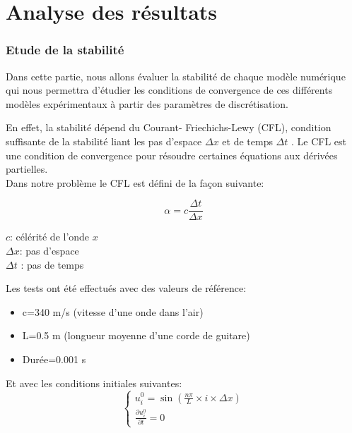\part{Analyse des résultats}


\section{Etude de la stabilité}

Dans cette partie, nous allons évaluer la stabilité de chaque modèle numérique qui nous permettra d'étudier les conditions de convergence de ces différents modèles expérimentaux à partir des paramètres de discrétisation.


En effet, la stabilité dépend du Courant- Friechichs-Lewy (CFL), condition suffisante de la stabilité liant les pas d'espace $\Delta x $ et de temps $\Delta t$ . Le CFL est une condition de convergence pour résoudre certaines équations aux dérivées partielles.\\

Dans notre problème le CFL est défini de la façon suivante:

\begin{minipage}{.6\textwidth}%
\centering
\begin{equation*}
     \alpha= c \frac{\Delta t}{\Delta x}  
\end{equation*}

\end{minipage}
\hfill
\begin{minipage}{.45\textwidth}%
\vspace{7mm}
$c$: célérité de l'onde $x$\\
$\Delta x$: pas d'espace\\
$\Delta t$ : pas de temps\\
     
\end{minipage}

Les tests ont été effectués avec des valeurs de référence:
\begin{itemize}
    \item c=340 m/s (vitesse d'une onde dans l'air)
    \item L=0.5 m (longueur moyenne d'une corde de guitare)
    \item Durée=0.001 s\\ 
\end{itemize}
Et avec les conditions initiales suivantes:
  \[
      \begin{cases}
        u^{0}_{i}=\sin(\frac{n \pi }{L} \times i \times \Delta x) \\
        \frac{\partial u^0_{i}}{\partial t}= 0
      \end{cases}
    \]\\


